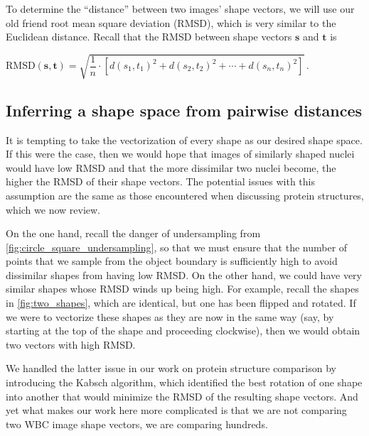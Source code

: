 \begin{note}\end{note}

To determine the ``distance'' between two images' shape vectors, we will use our old friend root mean square deviation (RMSD), which is very similar to the Euclidean distance. Recall that the RMSD between shape vectors $\mathbf{s}$ and $\mathbf{t}$ is

\begin{center}
$\text{RMSD}(\mathbf{s}, \mathbf{t}) = \sqrt{\dfrac{1}{n} \cdot \left[d(s_1, t_1)^2 + d(s_2, t_2)^2 + \cdots + d(s_n, t_n)^2\right]}\,.$
\end{center}

\FloatBarrier
{}
\subsection{Inferring a shape space from pairwise distances}

It is tempting to take the vectorization of every shape as our desired shape space. If this were the case, then we would hope that images of similarly shaped nuclei would have low RMSD and that the more dissimilar two nuclei become, the higher the RMSD of their shape vectors. The potential issues with this assumption are the same as those encountered when discussing protein structures, which we now review.

On the one hand, recall the danger of undersampling from \autoref{fig:circle_square_undersampling}, so that we must ensure that the number of points that we sample from the object boundary is sufficiently high to avoid dissimilar shapes from having low RMSD. On the other hand, we could have very similar shapes whose RMSD winds up being high. For example, recall the shapes in \autoref{fig:two_shapes}, which are identical, but one has been flipped and rotated. If we were to vectorize these shapes as they are now in the same way (say, by starting at the top of the shape and proceeding clockwise), then we would obtain two vectors with high RMSD.

We handled the latter issue in our work on protein structure comparison by introducing the Kabsch algorithm, which identified the best rotation of one shape into another that would minimize the RMSD of the resulting shape vectors. And yet what makes our work here more complicated is that we are not comparing  two WBC image shape vectors, we are comparing hundreds.

